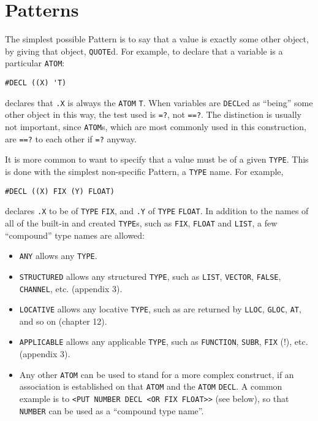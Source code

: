 \documentclass[a4paper]{scrbook}
\providecommand{\tightlist}{%
  \setlength{\itemsep}{0pt}\setlength{\parskip}{0pt}}
\begin{document}
\section{Patterns}\label{patterns}

The simplest possible Pattern is to say that a value is exactly some other object, by giving that object, \texttt{QUOTE}d.
For example, to declare that a variable is a particular \texttt{ATOM}:

\begin{verbatim}
#DECL ((X) 'T)
\end{verbatim}

declares that \texttt{.X} is always the \texttt{ATOM} \texttt{T}. When variables are \texttt{DECL}ed as ``being'' some
other object in this way, the test used is \texttt{=?}, not \texttt{==?}. The distinction is usually not important, since
\texttt{ATOM}s, which are most commonly used in this construction, are \texttt{==?} to each other if \texttt{=?} anyway.

It is more common to want to specify that a value must be of a given \texttt{TYPE}. This is done with the simplest
non-specific Pattern, a \texttt{TYPE} name. For example,

\begin{verbatim}
#DECL ((X) FIX (Y) FLOAT)
\end{verbatim}

declares \texttt{.X} to be of \texttt{TYPE} \texttt{FIX}, and \texttt{.Y} of \texttt{TYPE} \texttt{FLOAT}. In addition to
the names of all of the built-in and created \texttt{TYPE}s, such as \texttt{FIX}, \texttt{FLOAT} and \texttt{LIST}, a few
``compound'' type names are allowed:

\begin{itemize}
\tightlist
\item
  \texttt{ANY}  allows any \texttt{TYPE}.
\item
  \texttt{STRUCTURED}  allows any structured \texttt{TYPE}, such as \texttt{LIST},
  \texttt{VECTOR}, \texttt{FALSE}, \texttt{CHANNEL}, etc. (appendix 3).
\item
  \texttt{LOCATIVE}  allows any locative \texttt{TYPE}, such as are returned by
  \texttt{LLOC}, \texttt{GLOC}, \texttt{AT}, and so on (chapter 12).
\item
  \texttt{APPLICABLE}  allows any applicable \texttt{TYPE}, such as \texttt{FUNCTION},
  \texttt{SUBR}, \texttt{FIX} (!), etc. (appendix 3).
\item
  Any other \texttt{ATOM} can be used to stand for a more complex construct, if an association is established on that
  \texttt{ATOM} and the \texttt{ATOM} \texttt{DECL}. A common example is to
  \texttt{\textless{}PUT\ NUMBER\ DECL\ \textquotesingle{}\textless{}OR\ FIX\ FLOAT\textgreater{}\textgreater{}} (see
  below), so that \texttt{NUMBER} can be used as a ``compound type name''.
\end{itemize}
\end{document}
